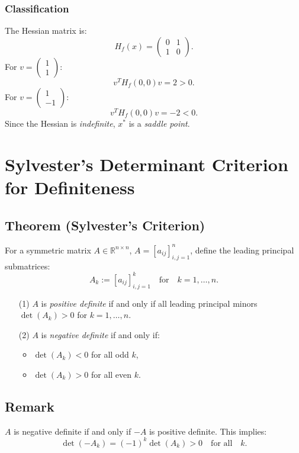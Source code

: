 \documentclass{article}
\begin{document}
\subsubsection*{Classification}
The Hessian matrix is:
\[
H_f(x) = 
\begin{pmatrix}
0 & 1 \\
1 & 0
\end{pmatrix}.
\]
For \( v = \begin{pmatrix} 1 \\ 1 \end{pmatrix} \):
\[
v^T H_f(0,0) v = 2 > 0.
\]
For \( v = \begin{pmatrix} 1 \\ -1 \end{pmatrix} \):
\[
v^T H_f(0,0) v = -2 < 0.
\]
Since the Hessian is \textit{indefinite}, \( x^* \) is a \textit{saddle point}.
\section*{Sylvester's Determinant Criterion for Definiteness}

\subsection*{Theorem (Sylvester's Criterion)}
For a symmetric matrix \( A \in \mathbb{R}^{n \times n} \), \( A = [a_{ij}]_{i,j=1}^n \), define the leading principal submatrices:
\[
A_k := [a_{ij}]_{i,j=1}^k \quad \text{for} \quad k = 1, \dots, n.
\]

\begin{enumerate}
    \item[(1)] \( A \) is \textit{positive definite} if and only if all leading principal minors \( \det(A_k) > 0 \) for \( k = 1, \dots, n \).

    \item[(2)] \( A \) is \textit{negative definite} if and only if:
    \begin{itemize}
        \item \( \det(A_k) < 0 \) for all odd \( k \),
        \item \( \det(A_k) > 0 \) for all even \( k \).
    \end{itemize}
\end{enumerate}

\subsection*{Remark}
\( A \) is negative definite if and only if \( -A \) is positive definite. This implies:
\[
\det(-A_k) = (-1)^k \det(A_k) > 0 \quad \text{for all} \quad k.
\]
\end{document}
